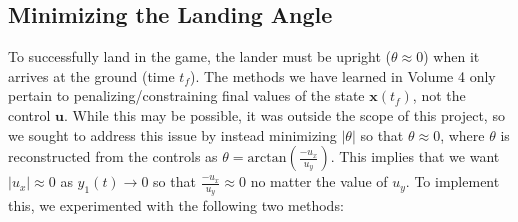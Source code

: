 \documentclass{article}
\begin{document}
\subsection{Minimizing the Landing Angle}
\label{subsec:landing-angle} 
To successfully land in the game, the lander must be upright ($\theta \approx 0$) when it arrives at the ground (time $t_f$). The methods we have learned in Volume 4 only pertain to penalizing/constraining final values of the state $\mathbf{x}(t_f)$, not the control $\mathbf{u}$. While this may be possible, it was outside the scope of this project, so we sought to address this issue by instead minimizing $|\theta|$ so that $\theta\approx0$, where $\theta$ is reconstructed from the controls as $\theta = \text{arctan}(\frac{-u_x}{u_y})$. 
This implies that we want $|u_x|\approx0$ as $y_1(t)\rightarrow0$ so that $\frac{-u_x}{u_y}\approx0$ no matter the value of $u_y$.
To implement this, we experimented with the following two methods:
\end{document}
